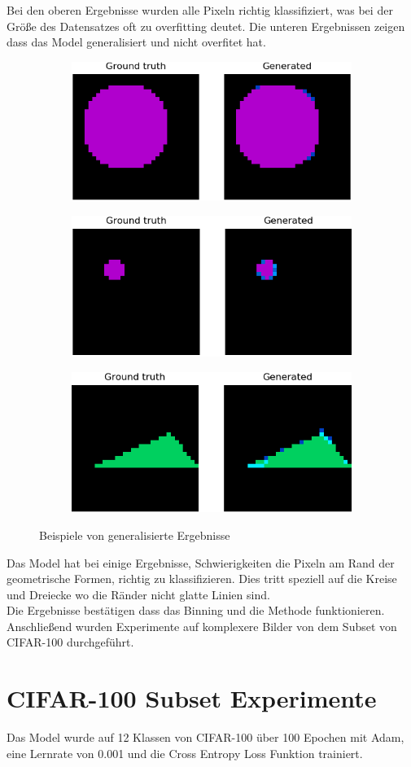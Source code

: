 Bei den oberen Ergebnisse wurden alle Pixeln richtig klassifiziert, was bei der Größe des Datensatzes oft zu overfitting deutet.
Die unteren Ergebnissen zeigen dass das Model generalisiert und nicht overfitet hat.

\begin{figure}[H]
  \vspace{1cm}
  \begin{subfigure}
    \centering
    \includegraphics[width=.32\textwidth]{resources/experiments/581.png}
  \end{subfigure}
  \begin{subfigure}
    \centering
    \includegraphics[width=.32\textwidth]{resources/experiments/712.png}
  \end{subfigure}
  \begin{subfigure}
    \centering
    \includegraphics[width=.32\textwidth]{resources/experiments/761.png}
  \end{subfigure}
  \caption{Beispiele von generalisierte Ergebnisse}
  \label{image:nicht-gute-ergebnisse-toy-dataset}
\end{figure}

Das Model hat bei einige Ergebnisse, Schwierigkeiten die Pixeln am Rand der geometrische Formen, richtig zu klassifizieren.
Dies tritt speziell auf die Kreise und Dreiecke wo die Ränder nicht glatte Linien sind.
\\
Die Ergebnisse bestätigen dass das Binning und die Methode funktionieren. Anschließend wurden Experimente auf komplexere Bilder
von dem Subset von CIFAR-100 durchgeführt.

\section{CIFAR-100 Subset Experimente}
Das Model wurde auf 12 Klassen von CIFAR-100 über 100 Epochen mit Adam, eine Lernrate von 0.001 und die Cross Entropy Loss Funktion
trainiert.


